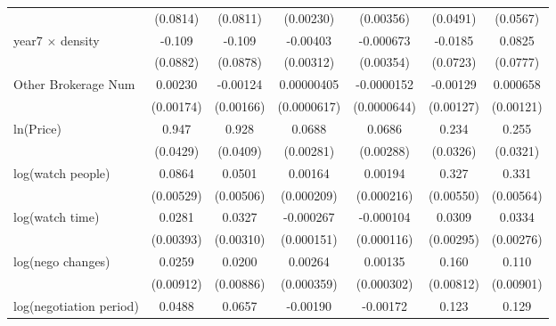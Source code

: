 {\begin{tabular}{l*{6}{c}}
            &    (0.0814)         &    (0.0811)         &   (0.00230)         &   (0.00356)         &    (0.0491)         &    (0.0567)         \\
\addlinespace
year7 $\times$ density&      -0.109         &      -0.109         &    -0.00403         &   -0.000673         &     -0.0185         &      0.0825         \\
            &    (0.0882)         &    (0.0878)         &   (0.00312)         &   (0.00354)         &    (0.0723)         &    (0.0777)         \\
\addlinespace
Other Brokerage Num  &     0.00230         &    -0.00124         &  0.00000405         &  -0.0000152         &    -0.00129         &    0.000658         \\
            &   (0.00174)         &   (0.00166)         & (0.0000617)         & (0.0000644)         &   (0.00127)         &   (0.00121)         \\
\addlinespace
ln(Price)&       0.947\sym{***}&       0.928\sym{***}&      0.0688\sym{***}&      0.0686\sym{***}&       0.234\sym{***}&       0.255\sym{***}\\
            &    (0.0429)         &    (0.0409)         &   (0.00281)         &   (0.00288)         &    (0.0326)         &    (0.0321)         \\
\addlinespace
log(watch people)&      0.0864\sym{***}&      0.0501\sym{***}&     0.00164\sym{***}&     0.00194\sym{***}&       0.327\sym{***}&       0.331\sym{***}\\
            &   (0.00529)         &   (0.00506)         &  (0.000209)         &  (0.000216)         &   (0.00550)         &   (0.00564)         \\
\addlinespace
log(watch time)&      0.0281\sym{***}&      0.0327\sym{***}&   -0.000267\sym{*}  &   -0.000104         &      0.0309\sym{***}&      0.0334\sym{***}\\
            &   (0.00393)         &   (0.00310)         &  (0.000151)         &  (0.000116)         &   (0.00295)         &   (0.00276)         \\
\addlinespace
log(nego changes)&      0.0259\sym{***}&      0.0200\sym{**} &     0.00264\sym{***}&     0.00135\sym{***}&       0.160\sym{***}&       0.110\sym{***}\\
            &   (0.00912)         &   (0.00886)         &  (0.000359)         &  (0.000302)         &   (0.00812)         &   (0.00901)         \\
\addlinespace
log(negotiation period)&      0.0488\sym{***}&      0.0657\sym{***}&    -0.00190\sym{***}&    -0.00172\sym{***}&       0.123\sym{***}&       0.129\sym{***}\\

\end{tabular}}
